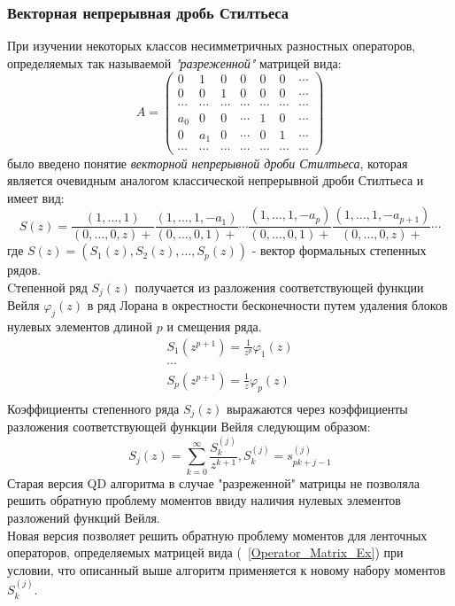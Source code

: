\subsubsection{Векторная непрерывная дробь Стилтьеса}
При изучении некоторых классов несимметричных разностных
операторов, определяемых так называемой \emph {"разреженной"}
 матрицей вида:
\begin{equation}
\label{Operator_Matrix_Ex}
A= \left(\begin{array}{ccccccc}
0 & 1&0&0&0&0&\cdots\\
0 & 0 &1&0&0&0&\cdots\\
\cdots&\cdots&\cdots&\cdots&\cdots&\cdots&\cdots\\
a_0&0&0&\cdots&1&0&\cdots\\
0&a_1&0&\cdots&0&1&\cdots\\
\cdots&\cdots&\cdots&\cdots&\cdots&\cdots&\cdots
\end{array}\right)
\end{equation}
было введено понятие \emph {векторной непрерывной дроби Стилтьеса}, которая является очевидным аналогом классической непрерывной
дроби Стилтьеса и имеет вид:
$$
S(z)=\frac{(1,\ldots,1)}{(0,\ldots,0,z)+}
\frac{(1,\ldots,1,-a_1)}{(0,\ldots,0,1)+}\cdots
\frac{(1,\ldots,1,-a_p)}{(0,\ldots,0,1)+}
\frac{(1,\ldots,1,-a_{p+1})}{(0,\ldots,0,z)+}\cdots
$$
где $S(z)=(S_1(z), S_2(z), \ldots, S_p(z))$ - вектор формальных
степенных рядов. \\
Cтепенной ряд $S_j(z)$ получается из разложения соответствующей
функции Вейля $\varphi_j(z)$ в ряд Лорана в окрестности
бесконечности путем удаления блоков нулевых элементов длиной $p$
и смещения ряда.
\begin{eqnarray}
S_1(z^{p+1}) = \frac{1}{z^p}\varphi_1(z) \nonumber \\
\cdots \nonumber \\
S_p(z^{p+1}) = \frac{1}{z}\varphi_p(z) \nonumber \\
\end{eqnarray}
Коэффициенты степенного ряда $S_j(z)$ выражаются через
коэффициенты разложения соответствующей функции Вейля следующим
образом:
$$
S_j(z)=\sum_{k=0}^{\infty}{\frac{S_k^{(j)}}{z^{k+1}}},
S_k^{(j)}=s_{pk+j-1}^{(j)}
$$
Старая версия QD алгоритма в случае "разреженной" матрицы не
позволяла решить обратную проблему моментов ввиду наличия нулевых
элементов разложений функций Вейля.\\
Новая версия позволяет решить обратную проблему моментов для
ленточных операторов, определяемых матрицей вида
(~\ref{Operator_Matrix_Ex}) при условии, что описанный выше алгоритм применяется к новому набору моментов $S_k^{(j)}$.\\
